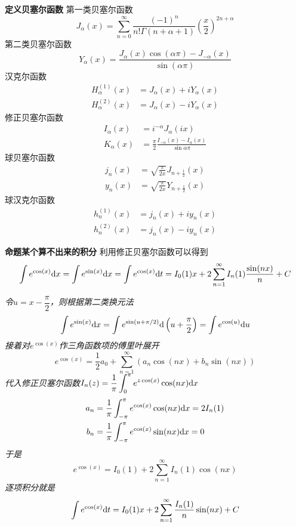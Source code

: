 \documentclass[UTF8]{ctexart}
\newcommand{\trm}[1]{{\rm #1}}
\newenvironment{definition}[1]
    {\begin{tcolorbox}[enhanced, colback=LightYellow, breakable=false, frame hidden, borderline west={1.5mm}{-2mm}{DarkGreen}]
    {\bfseries {\color{DarkGreen} 定义}\quad #1} \newline}
    {\end{tcolorbox}}
\newenvironment{proposition}[1]
    {\begin{tcolorbox}[enhanced, colback=LightYellow, breakable=true, frame hidden, borderline west={1.5mm}{-2mm}{Purple}]
    {\bfseries {\color{Purple} 命题}\quad #1} \newline}
    {\end{tcolorbox}}
\begin{document}
\begin{definition}{贝塞尔函数}
    第一类贝塞尔函数
    \[J_{\alpha}(x) = \sum_{n=0}^{\infty} \frac{(-1)^{n}}{n!\Gamma (n+\alpha +1)}{\left({\frac {x}{2}}\right)}^{2n+\alpha}\]
    第二类贝塞尔函数
    \[Y_{\alpha}(x) = \frac{J_{\alpha}(x)\cos(\alpha\pi)-J_{-\alpha}(x)}{\sin(\alpha\pi)}\]
    汉克尔函数
    \[
        \begin{aligned}
            H_{\alpha }^{(1)}(x) &= J_{\alpha }(x)+iY_{\alpha }(x) \\ 
            H_{\alpha}^{(2)}(x) &= J_{\alpha}(x)-iY_{\alpha}(x) 
        \end{aligned}
    \]
    修正贝塞尔函数
    \[
        \begin{aligned}
            I_{\alpha }(x) &= i^{-\alpha }J_{\alpha }(ix) \\
            K_{\alpha }(x) &= \frac {\pi }{2}{\frac {I_{-\alpha }(x)-I_{\alpha }(x)}{\sin \alpha \pi }} 
        \end{aligned}
    \]
    球贝塞尔函数
    \[
        \begin{aligned}
            j_{n}(x) &= \sqrt{\frac {\pi }{2x}}J_{n+{\frac {1}{2}}}(x) \\
            y_{n}(x) &= \sqrt{\frac {\pi }{2x}}Y_{n+{\frac {1}{2}}}(x)
        \end{aligned}
    \]
    球汉克尔函数
    \[
        \begin{aligned}
            h_{n}^{(1)}(x) &= j_{n}(x)+iy_{n}(x) \\
            h_{n}^{(2)}(x) &= j_{n}(x)-iy_{n}(x)
        \end{aligned}
    \]
\end{definition}

\begin{proposition}{某个算不出来的积分}
    利用修正贝塞尔函数可以得到
    \[\int e^{\cos(x)}\trm{d}x = \int e^{\sin(x)}\trm{d}x = \int e^{\cos(x)}\trm{d}t=I_0(1)x+2\sum_{n=1}^{\infty}I_n(1)\frac{\sin(nx)}{n} + C\]
\end{proposition}

\textit{
    令\(u=x-\dfrac{\pi}{2}\)，则根据第二类换元法
    \[\int e^{\sin(x)}\trm{d}x = \int e^{\sin(u+\pi/2)}\trm{d}\left(u+\frac{\pi}{2}\right)=\int e^{\cos(u)}\trm{d}u\]
    接着对\(e^{\cos(x)}\)作三角函数项的傅里叶展开
    \[e^{\cos(x)}=\frac{1}{2}a_0+\sum_{n=1}^{\infty}\left(a_n\cos(nx)+b_n\sin(nx)\right)\]
    代入修正贝塞尔函数\(\displaystyle{I_n(z)=\frac{1}{\pi}\int_{0}^{\pi}e^{z\cos(x)}\cos(nx)\trm{d}x}\)
    \[
        \begin{aligned}
            a_n&=\frac{1}{\pi}\int_{-\pi}^{\pi}e^{\cos(x)}\cos(nx)\trm{d}x=2I_n(1) \\
            b_n&=\frac{1}{\pi}\int_{-\pi}^{\pi}e^{\cos(x)}\sin(nx)\trm{d}x=0
        \end{aligned}
    \]
    于是
    \[e^{\cos(x)}=I_0(1)+2\sum_{n=1}^{\infty}I_n(1)\cos(nx)\]
    逐项积分就是
    \[\int e^{\cos(x)}\trm{d}t=I_0(1)x+2\sum_{n=1}^{\infty}\frac{I_n(1)}{n}\sin(nx) + C\]
}
\end{document}
